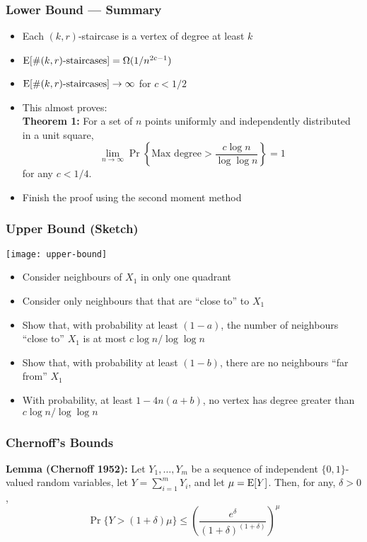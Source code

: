 \documentclass{beamer}
\begin{document}
\frame
{
  \frametitle{Lower Bound --- Summary}

  \begin{itemize}
    \item Each $(k,r)$-staircase is a vertex of degree at least $k$
    \item $\mathrm{E}[\mbox{\#$(k,r)$-staircases}]=\Omega(1/n^{2c-1})$
    \item $\mathrm{E}[\mbox{\#$(k,r)$-staircases}]\rightarrow\infty$ for $c < 1/2$
    \item This almost proves:\\
       \textbf{Theorem 1:}
           For a set of $n$ points uniformly and independently distributed
		in a unit square, 
           \[\lim_{n\rightarrow\infty}
              \Pr\left\{\mbox{Max degree} > \frac{c\log
n}{\log\log n}\right\} = 1 \]
           for any $c < 1/4$.
    \item Finish the proof using the second moment method
  \end{itemize}
}

\frame
{
  \frametitle{Upper Bound (Sketch)}

  \begin{center}
    \texttt{[image: upper-bound]}
  \end{center}
  \begin{itemize}
    \item Consider neighbours of $X_1$ in only one quadrant
    \item Consider only neighbours that that are ``close to'' to $X_1$
    \item Show that, with probability at least $(1-a)$, the number of
neighbours ``close to'' $X_1$ is at most $c\log n/\log\log n$
    \item Show that, with probability at least $(1-b)$, there are no neighbours
   ``far from'' $X_1$
    \item With probability, at least $1-4n(a+b)$,
no vertex has degree greater than $c\log n/\log\log n$
  \end{itemize}
}

\frame
{
  \frametitle{Chernoff's Bounds}

    \textbf{Lemma (Chernoff 1952):}
    Let $Y_1,\ldots,Y_m$ be a sequence of independent $\{0,1\}$-valued
    random variables, let $Y=\sum_{i=1}^m Y_i$, and let $\mu=\mathrm{E}[Y]$.
    Then, for any, $\delta > 0$,
    \[
       \Pr\{Y > (1+\delta)\mu\} 
         \le \left(\frac{e^{\delta}}{(1+\delta)^{(1+\delta)}}\right)^{\mu}
    \]
}
\end{document}
